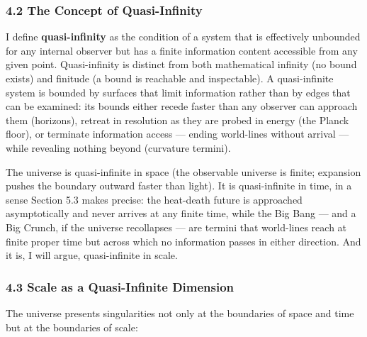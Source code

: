 \documentclass[
]{article}
\begin{document}
\hypertarget{the-concept-of-quasi-infinity}{%
\subsubsection{4.2 The Concept of
Quasi-Infinity}\label{the-concept-of-quasi-infinity}}

I define \textbf{quasi-infinity} as the condition of a system that is
effectively unbounded for any internal observer but has a finite
information content accessible from any given point. Quasi-infinity is
distinct from both mathematical infinity (no bound exists) and finitude
(a bound is reachable and inspectable). A quasi-infinite system is
bounded by surfaces that limit information rather than by edges that can
be examined: its bounds either recede faster than any observer can
approach them (horizons), retreat in resolution as they are probed in
energy (the Planck floor), or terminate information access --- ending
world-lines without arrival --- while revealing nothing beyond
(curvature termini).

The universe is quasi-infinite in space (the observable universe is
finite; expansion pushes the boundary outward faster than light). It is
quasi-infinite in time, in a sense Section 5.3 makes precise: the
heat-death future is approached asymptotically and never arrives at any
finite time, while the Big Bang --- and a Big Crunch, if the universe
recollapses --- are termini that world-lines reach at finite proper time
but across which no information passes in either direction. And it is, I
will argue, quasi-infinite in scale.

\hypertarget{scale-as-a-quasi-infinite-dimension}{%
\subsubsection{4.3 Scale as a Quasi-Infinite
Dimension}\label{scale-as-a-quasi-infinite-dimension}}

The universe presents singularities not only at the boundaries of space
and time but at the boundaries of scale:
\end{document}
